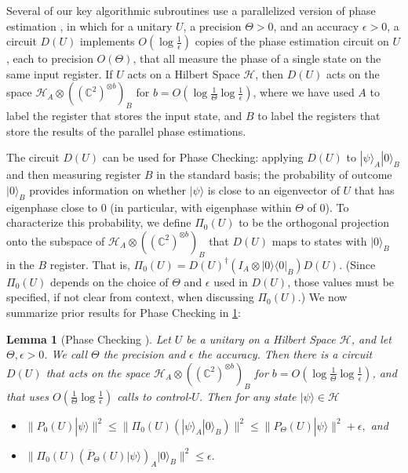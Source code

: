 \documentclass[cleveref, autoref, thm-restate,11pt]{article}
\newtheorem{lemma}[theorem]{Lemma}
\theoremstyle{definition}
\newcommand{\sop}[1]{{\mathcal #1}}
\newcommand{\ket}[1]{|#1\rangle}
\newcommand{\proj}[1]{|#1\rangle\!\langle#1|}
\begin{document}
Several of our key algorithmic subroutines use a parallelized
version of phase estimation
\cite{magniezSearchQuantumWalk2011}, in which for a unitary $U$, a precision $\Theta>0$,
and an accuracy $\epsilon>0$, a circuit $D(U)$ implements
$O(\log\frac{1}{\epsilon})$ copies of the phase estimation circuit on $U$,
each to precision $O(\Theta)$, that all measure the phase of a single state on
the same input register. If $U$ acts on a Hilbert Space $\sop H$, then $D(U)$
acts on the space $\sop H_A\otimes((\mathbb{C}^{2})^{\otimes b})_B$ for
$b=O\left(\log\frac{1}{\Theta}\log\frac{1}{\epsilon}\right)$, where we have  used
$A$ to label the register that stores the input state, and $B$ to label the
registers that store the results of the parallel phase estimations. 

The circuit $D(U)$ can be used for Phase Checking: applying $D(U)$ 
to $\ket{\psi}_A\ket{0}_B$ and then measuring register $B$ 
in the standard basis; the probability of outcome $\ket{0}_B$ provides
information on whether $\ket{\psi}$ is close to an eigenvector of $U$ that has eigenphase close to
$0$ (in particular, with eigenphase within $\Theta$ of $0$). To characterize this
probability, we define $\Pi_0(U)$ to be the orthogonal projection onto the
subspace of $\sop H_A\otimes((\mathbb{C}^{2})^{\otimes b})_B$ that $D(U)$ maps
to states with $\ket{0}_B$ in the $B$ register.  That is,
$\Pi_0(U)=D(U)^\dagger \left(I_A\otimes\proj{0}_B\right) D(U).$ (Since
$\Pi_0(U)$ depends on the choice of $\Theta$ and $\epsilon$ used in $D(U)$,
those values must be specified, if not clear from context, when discussing
$\Pi_0(U)$.)  We now summarize  prior results for Phase Checking
 in \cref{lem:phase_det}:

\begin{lemma}[Phase Checking \cite{kitaevQuantumMeasurementsAbelian1995,cleveQuantumAlgorithmsRevisited1998,magniezSearchQuantumWalk2011}]
Let $U$ be a unitary on a Hilbert Space $\sop H$, and let $\Theta,\epsilon>0$. We call $\Theta$ the precision and $\epsilon$ the accuracy. Then there is a circuit $D(U)$ that acts on the space $\sop H_A\otimes
((\mathbb{C}^{2})^{\otimes b})_B$ for $b=O\left(\log\frac{1}{\Theta}\log\frac{1}{\epsilon}\right)$, and that
uses $O\left(\frac{1}{\Theta}\log\frac{1}{\epsilon}\right)$ calls to
control-$U$.  Then for any state $\ket{\psi}\in \sop H$
\begin{itemize}
\item $ \|P_0(U)\ket{\psi}\|^2\leq \|\Pi_0(U)\left(\ket{\psi}_A\ket{0}_B\right)\|^2\leq \|P_\Theta(U)\ket{\psi}\|^2+\epsilon,$ and
\item $\|\Pi_0(U)\left(\overline{P}_\Theta(U)\ket{\psi}\right)_A\ket{0}_B\|^2\leq \epsilon.$
\end{itemize}
\label{lem:phase_det}
\end{lemma}
\end{document}
